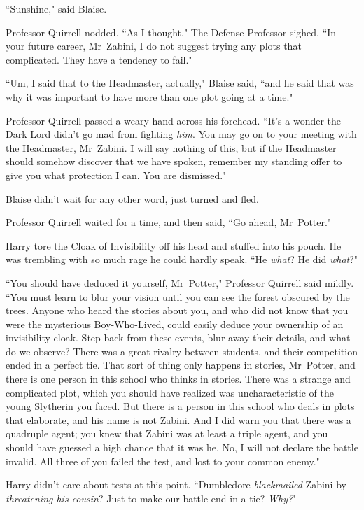 ``Sunshine," said Blaise.

Professor Quirrell nodded. ``As I thought." The Defense Professor sighed. ``In your future career, Mr~Zabini, I do not suggest trying any plots that complicated. They have a tendency to fail."

``Um, I said that to the Headmaster, actually," Blaise said, ``and he said that was why it was important to have more than one plot going at a time."

Professor Quirrell passed a weary hand across his forehead. ``It's a wonder the Dark Lord didn't go mad from fighting \emph{him}. You may go on to your meeting with the Headmaster, Mr~Zabini. I will say nothing of this, but if the Headmaster should somehow discover that we have spoken, remember my standing offer to give you what protection I can. You are dismissed."

Blaise didn't wait for any other word, just turned and fled.

\later

Professor Quirrell waited for a time, and then said, ``Go ahead, Mr~Potter."

Harry tore the Cloak of Invisibility off his head and stuffed into his pouch. He was trembling with so much rage he could hardly speak. ``He \emph{what}? He did \emph{what}?"

``You should have deduced it yourself, Mr~Potter," Professor Quirrell said mildly. ``You must learn to blur your vision until you can see the forest obscured by the trees. Anyone who heard the stories about you, and who did not know that you were the mysterious Boy-Who-Lived, could easily deduce your ownership of an invisibility cloak. Step back from these events, blur away their details, and what do we observe? There was a great rivalry between students, and their competition ended in a perfect tie. That sort of thing only happens in stories, Mr~Potter, and there is one person in this school who thinks in stories. There was a strange and complicated plot, which you should have realized was uncharacteristic of the young Slytherin you faced. But there is a person in this school who deals in plots that elaborate, and his name is not Zabini. And I did warn you that there was a quadruple agent; you knew that Zabini was at least a triple agent, and you should have guessed a high chance that it was he. No, I will not declare the battle invalid. All three of you failed the test, and lost to your common enemy."

Harry didn't care about tests at this point. ``Dumbledore \emph{blackmailed} Zabini by \emph{threatening his cousin}? Just to make our battle end in a tie? \emph{Why?}"

